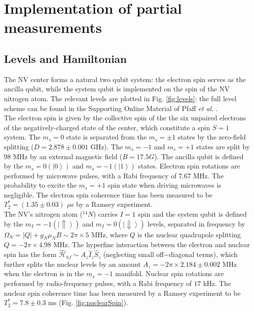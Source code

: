 \graphicspath{{./ch_adptv_msmnt_cntrl_SI/figures/}}


\chapter{Implementation of partial measurements}
\label{ch:AMCappendix}

\def\bra#1{\left<#1\right|}
\def\ket#1{\left|#1\right>}
\def\dm#1{\left|#1\right> \left<#1\right|}


\section*{Levels and Hamiltonian}
The NV center forms a natural two qubit system: the electron spin serves as the ancilla qubit, while the system qubit is implemented on the spin of the NV nitrogen atom. The relevant levels are plotted in Fig. \ref{fig:levels}: the full level scheme can be found in the Supporting Online Material of Pfaff \textit{et al}. \cite{Pfaff_NatPhys_2012}.\\
The electron spin is given by the collective spin of the the six unpaired electrons of the negatively-charged state of the center, which constitute a spin $S=1$ system. The $m_s=0$ state is separated from the $m_s=\pm1$ states by the zero-field splitting ($D = 2.878 \pm 0.001$ GHz). The $m_s=-1$ and $m_s=+1$ states are split by $ 98$ MHz by an external magnetic field ($B = 17.5 G$). The ancilla qubit is defined by the $m_s=0  (\ket{0})$ and $m_s=-1  (\ket{1})$ states. Electron spin rotations are performed by microwave pulses, with a Rabi frequency of $ 7.67$ MHz. The probability to excite the $m_s=+1$ spin state when driving microwaves is negligible. The electron spin coherence time has been measured to be $T_2^* = (1.35 \pm 0.03)$ $\mu$s by a Ramsey experiment.\\
The NV's nitrogen atom ($^{14}N$) carries $I=1$ spin and the system qubit is defined by the $m_I = -1 (\ket{\Uparrow})$ and $m_I=0 (\ket{\Downarrow})$ levels, separated in frequency by $\Omega_N = |Q| + g_N \mu_N B \sim 2 \pi \times 5$ MHz, where $Q$ is the nuclear quadrupole splitting $Q = -2\pi \times 4.98 $ MHz. The hyperfine interaction between the electron and nuclear spin has the form $\mathcal{\hat{H}}_{hf} \sim A_z \hat{I}_z \hat{S}_z$ (neglecting small off$-$diagonal terms), which further splits the nuclear levels by an amount $A_z = -2\pi \times 2.184 \pm 0.002$ MHz when the electron is in the $m_s=-1$ manifold.
Nuclear spin rotations are performed by radio-frequency pulses, with a Rabi frequency of $17$ kHz. The nuclear spin coherence time has been measured by a Ramsey experiment to be $T_2^* = 7.8 \pm 0.3$ ms (Fig. \ref{fig:nuclearSpin}).\\

